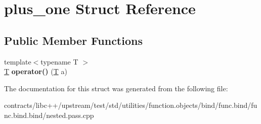 \hypertarget{structplus__one}{}\section{plus\+\_\+one Struct Reference}
\label{structplus__one}
\subsection*{Public Member Functions}
\begin{DoxyCompactItemize}
\item 
\mbox{\label{structplus__one_ae26d73f1da5bdba8638da4a1c7735080}} 
{\footnotesize template$<$typename T $>$ }\\\mbox{\hyperlink{struct_t}{T}} {\bfseries operator()} (\mbox{\hyperlink{struct_t}{T}} a)
\end{DoxyCompactItemize}


The documentation for this struct was generated from the following file\+:\begin{DoxyCompactItemize}
\item 
contracts/libc++/upstream/test/std/utilities/function.\+objects/bind/func.\+bind/func.\+bind.\+bind/nested.\+pass.\+cpp\end{DoxyCompactItemize}

